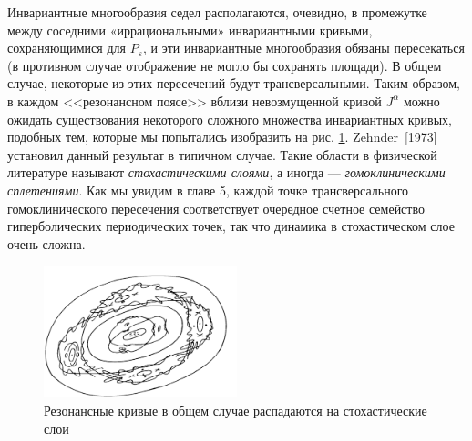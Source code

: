 \documentclass[twoside, a4paper]{article}
\begin{document}
Инвариантные многообразия седел располагаются, очевидно, в промежутке между соседними «иррациональными» инвариантными кривыми, сохраняющимися для $P_\varepsilon$, и эти инвариантные многообразия обязаны пересекаться (в противном случае отображение не могло бы сохранять площади). В общем случае, некоторые из этих пересечений будут трансверсальными. Таким образом, в каждом <<резонансном поясе>> вблизи невозмущенной
кривой $J^\alpha$ можно ожидать существования некоторого сложного множества инвариантных кривых, подобных тем, которые мы попытались изобразить на рис. \ref{fig:pic3}. Zehnder~[1973] установил данный результат в типичном случае. Такие области в физической литературе называют \emph{стохастическими слоями}, а иногда --- \emph{гомоклиническими сплетениями}. Как мы увидим в главе 5, каждой точке трансверсального гомоклинического пересечения соответствует очередное счетное семейство гиперболических периодических точек, так что динамика в стохастическом слое очень сложна.
\begin{figure}
\centering
\includegraphics[width=0.5\textwidth]{curves}
\caption{Резонансные кривые в общем случае распадаются на стохастические слои}
\label{fig:pic3}
\end{figure}
\end{document}
